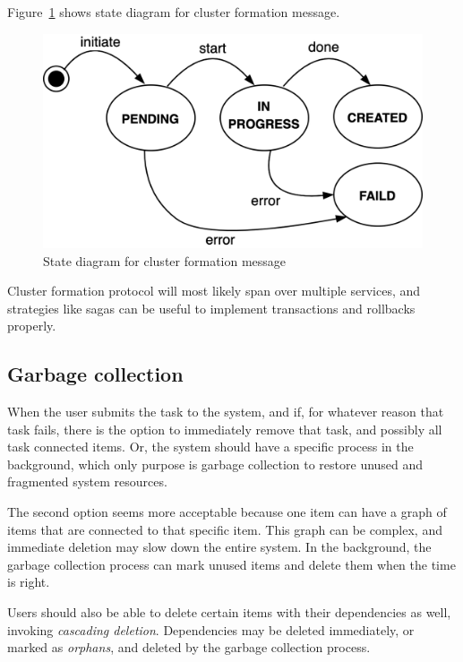 Figure~\ref{fig:fig19} shows state diagram for cluster formation message.

\begin{figure}[H]
	\begin{center}
		\includegraphics[scale=1]{images/Figure19}
	\end{center}
	\vspace{-0.6cm}
	\caption{State diagram for cluster formation message}
	\label{fig:fig19}
\end{figure}

Cluster formation protocol will most likely span over multiple services, and strategies like sagas can be useful to implement transactions and rollbacks properly.
%
%
\subsection{Garbage collection}\label{sec:garbage}
%
When the user submits the task to the system, and if, for whatever reason that task fails, there is the option to immediately remove that task, and possibly all task connected items. Or, the system should have a specific process in the background, which only purpose is garbage collection to restore unused and fragmented system resources.

The second option seems more acceptable because one item can have a graph of items that are connected to that specific item. This graph can be complex, and immediate deletion may slow down the entire system. In the background, the garbage collection process can mark unused items and delete them when the time is right.

Users should also be able to delete certain items with their dependencies as well, invoking \emph{cascading deletion}. Dependencies may be deleted immediately, or marked as \emph{orphans}, and deleted by the garbage collection process.

